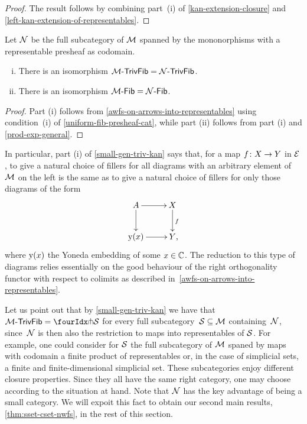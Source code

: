 \documentclass[reqno,10pt,a4paper,oneside,draft]{amsart}
\begin{document}
\begin{proof}
The result follows by combining part~(i) of \cref{kan-extension-closure} and \cref{left-kan-extension-of-representables}.
\end{proof}

\begin{lemma} \label{small-gen-triv-kan}
Let $\cal{N}$ be the full subcategory of $\cal{M}$ spanned by the mononorphisms with a representable presheaf as codomain.
\begin{enumerate}[(i)]
\item There is an isomorphism $\TrivFib{\cal{M}} = \TrivFib{\cal{N}}$.
\item There is an isomorphism $\Fib{\cal{M}} = \Fib{\cal{N}}$.
\end{enumerate}
\end{lemma}

\begin{proof}
Part (i) follows from \cref{awfs-on-arrows-into-representables} using condition~(i) of \cref{uniform-fib-presheaf-cat}, while part (ii) follows from part (i) and \cref{prod-exp-general}.
\end{proof}

In particular, part (i) of \cref{small-gen-triv-kan} says that, for a map $f \co X \to Y$ in $\catE$, to give a natural choice of fillers for all diagrams with an arbitrary element of $\cal{M}$ on the left is the same as to give a natural choice of fillers for only those diagrams of the form
\[
\xymatrix{
  A
  \ar[r]
  \ar[d]
&
  X
  \ar[d]^f
\\
  \yon(x)
  \ar[r]
&
  Y
\rlap{,}}
\]
where $\yon(x)$ the Yoneda embedding of some $x \in \catC$.
The reduction to this type of diagrams relies essentially on the good behaviour of the right orthogonality functor with respect to colimits as described in~\cref{awfs-on-arrows-into-representables}.

Let us point out that by \cref{small-gen-triv-kan} we have that $\TrivFib{\cal{M}} = \liftr{\cal{S}}$ for every full subcategory~$\cal{S} \subseteq \cal{M}$ containing~$\cal{N}$, since~$\cal{N}$ is then also the restriction to maps into representables of $\cal{S}$.
For example, one could consider for $\cal{S}$ the full subcategory of $\cal{M}$ spaned by maps with codomain a finite product of representables or, in the case of simplicial sets, a finite and finite-dimensional simplicial set.
These subcategories enjoy different closure properties.
Since they all have the same right category, one may choose according to the situation at hand.
Note that $\cal{N}$ has the key advantage of being a small category.
We will expoit this fact to obtain our second main results, \cref{thm:sset-cset-nwfs}, in the rest of this section.
\end{document}
